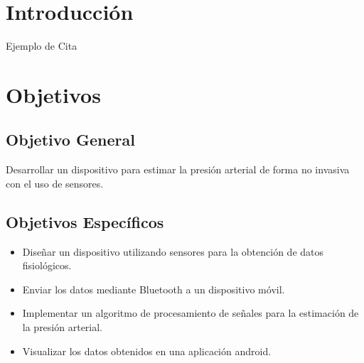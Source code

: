 \setcounter{page}{1} %

\section{Introducción}


Ejemplo de Cita \cite{ns2}

\section{Objetivos}
    \subsection{Objetivo General}
    Desarrollar un dispositivo para estimar la presión arterial de forma no invasiva con el uso de sensores.
    \subsection{Objetivos Específicos}
    \begin{itemize}
        \item Diseñar un dispositivo utilizando sensores para la obtención de datos fisiológicos.
        \item Enviar los datos mediante Bluetooth a un dispositivo móvil.
        \item Implementar un algoritmo de procesamiento de señales para la estimación de la presión arterial.
        \item Visualizar los datos obtenidos en una aplicación android.
    \end{itemize}


